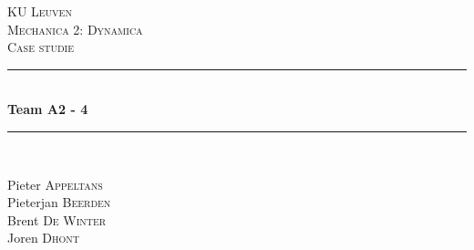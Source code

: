 \documentclass[a4paper,10pt]{article}
\begin{document}
\begin{titlepage}

\newcommand{\HRule}{\rule{\linewidth}{0.5mm}} %

\center %
 

\textsc{\LARGE KU Leuven}\\[1.5cm] %
\textsc{\Large Mechanica 2: Dynamica}\\[0.5cm] %
\textsc{\large Case studie }\\[0.5cm] %


\HRule \\[0.4cm]
{ \huge \bfseries Team A2 - 4}\\[0.4cm] %
\HRule \\[1.5cm]
 

\begin{minipage}{0.4\textwidth}
\begin{center} \large

Pieter \textsc{Appeltans}\\
Pieterjan \textsc{Beerden}\\
Brent \textsc{De Winter}\\
Joren \textsc{Dhont} %
\end{center}
\end{minipage}\\[1cm]
~





\end{titlepage}
\end{document}
